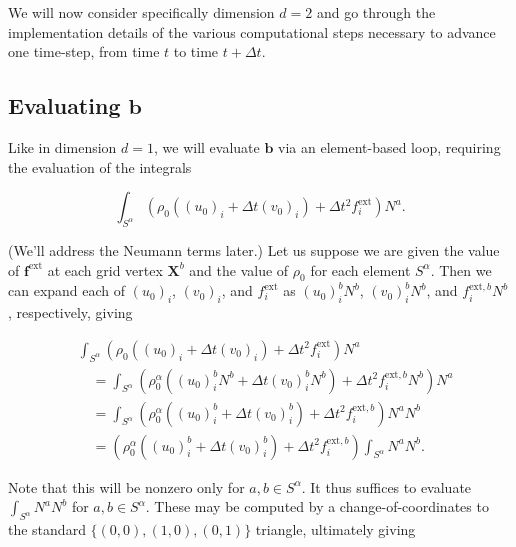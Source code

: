 \documentclass{article}
\begin{document}
We will now consider specifically dimension \(d = 2\) and go through the implementation details of the various computational steps necessary to advance one time-step, from time \(t\) to time \(t + \Delta t\).

\subsection{Evaluating \(\mathbf{b}\)}

Like in dimension \(d = 1\), we will evaluate \(\mathbf{b}\) via an element-based loop, requiring the evaluation of the integrals

\begin{equation}
\int_{S^{\alpha}} \left( \rho_0 \left( (u_0)_i + \Delta t (v_0)_i \right) + \Delta t^2 f^{\text{ext}}_i \right) N^a.
\end{equation}

(We'll address the Neumann terms later.)  Let us suppose we are given the value of \(\mathbf{f}^{\text{ext}}\) at each grid vertex \(\mathbf{X}^b\) and the value of \(\rho_0\) for each element \(S^{\alpha}\).  Then we can expand each of \((u_0)_i\), \((v_0)_i\), and \(f^{\text{ext}}_i\) as \((u_0)_i^b N^b\), \((v_0)_i^b N^b\), and \(f^{\text{ext},b}_i N^b\), respectively, giving

\begin{equation}
\begin{split}
& \int_{S^{\alpha}} \left( \rho_0 \left( (u_0)_i + \Delta t (v_0)_i \right) + \Delta t^2 f^{\text{ext}}_i \right) N^a \\
& \quad = \int_{S^{\alpha}} \left( \rho_0^{\alpha} \left( (u_0)_i^b N^b + \Delta t (v_0)_i^b N^b \right) + \Delta t^2 f^{\text{ext},b}_i N^b \right) N^a \\
& \quad = \int_{S^{\alpha}} \left( \rho_0^{\alpha} \left( (u_0)_i^b + \Delta t (v_0)_i^b \right) + \Delta t^2 f^{\text{ext},b}_i \right) N^a N^b \\
& \quad = \left( \rho_0^{\alpha} \left( (u_0)_i^b + \Delta t (v_0)_i^b \right) + \Delta t^2 f^{\text{ext},b}_i \right) \int_{S^{\alpha}} N^a N^b.
\end{split}
\end{equation}

Note that this will be nonzero only for \(a,b \in S^{\alpha}\).  It thus suffices to evaluate \(\int_{S^{\alpha}} N^a N^b\) for \(a,b \in S^{\alpha}\).  These may be computed by a change-of-coordinates to the standard \(\{(0,0), (1,0), (0,1)\}\) triangle, ultimately giving
\end{document}
